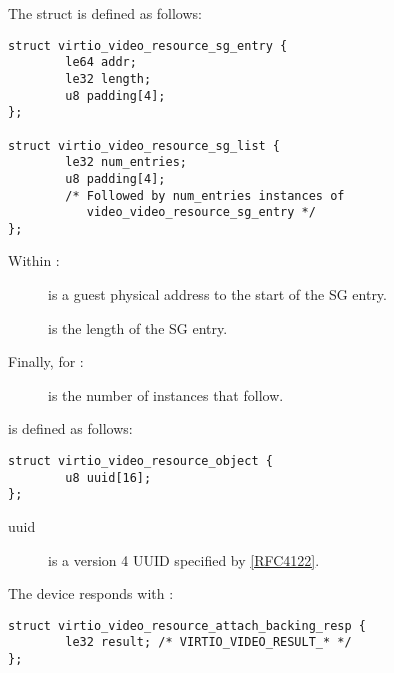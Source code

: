 The struct  is defined as follows:

\begin{lstlisting}
struct virtio_video_resource_sg_entry {
        le64 addr;
        le32 length;
        u8 padding[4];
};

struct virtio_video_resource_sg_list {
        le32 num_entries;
        u8 padding[4];
        /* Followed by num_entries instances of
           video_video_resource_sg_entry */
};
\end{lstlisting}

Within :

\begin{description}
\item[]
is a guest physical address to the start of the SG entry.
\item[]
is the length of the SG entry.
\end{description}

Finally, for :

\begin{description}
\item[]
is the number of  instances
that follow.
\end{description}

 is defined as follows:

\begin{lstlisting}
struct virtio_video_resource_object {
        u8 uuid[16];
};
\end{lstlisting}

\begin{description}
\item[uuid]
is a version 4 UUID specified by \hyperref[intro:rfc4122]{[RFC4122]}.
\end{description}

The device responds with
:

\begin{lstlisting}
struct virtio_video_resource_attach_backing_resp {
        le32 result; /* VIRTIO_VIDEO_RESULT_* */
};
\end{lstlisting}

